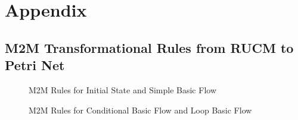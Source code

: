 \chapter{Appendix}
\section{M2M Transformational Rules from RUCM to Petri Net}\label{m2mrulesmain}


%    
%   

\begin{figure}[H]
\centering
{}
\caption{M2M Rules for Initial State and Simple Basic Flow}
\label{fig:m2mrulesdiagram1}
\end{figure}


\begin{figure}[H]
\centering
{}
\caption{M2M Rules for Conditional Basic Flow and Loop Basic Flow}
\label{fig:m2mrulesdiagram2}
\end{figure}

